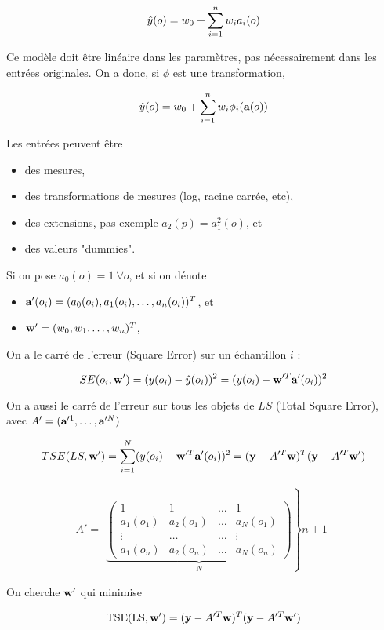 	$$\hat{y}(o) = w_0 + \sum_{i = 1}^n w_i a_i(o)$$
	
	Ce modèle doit être linéaire dans les paramètres, pas nécessairement dans les entrées originales. On a donc, si $\phi$ est une transformation,
	
	$$\hat{y}(o) = w_0 + \sum_{i = 1}^n w_i \phi_i(\textbf{a}(o))$$
	
	Les entrées peuvent être
	
	\begin{itemize}
		\item des mesures,
		\item des transformations de mesures (log, racine carrée, etc),
		\item des extensions, pas exemple $a_2(p) = a^2_1(o)$, et
		\item des valeurs "dummies".
	\end{itemize}
	
	
	Si on pose $a_0(o) = 1 \: \forall o$, et si on dénote
	
	\begin{itemize}
		\item $\textbf{a}'(o_i) = (a_0(o_i), a_1(o_i), \dots , a_n(o_i))^T$, et
		\item $\textbf{w}' = (w_0, w_1, \dots , w_n)^T$,
	\end{itemize}
	
	On a le carré de l'erreur (Square Error) sur un échantillon $i$ :
	
	$$SE(o_i, \textbf{w}') = (y(o_i) - \hat{y}(o_i))^2 = (y(o_i) - \textbf{w}'^T\textbf{a}'(o_i))^2$$
	
	On a aussi le carré de l'erreur sur tous les objets de $LS$ (Total Square Error), avec $A' = (\textbf{a}'^1, \dots , \textbf{a}'^N)$
	
	$$TSE(LS, \textbf{w}') = \sum_{i = 1}^N (y(o_i) - \textbf{w}'^T\textbf{a}'(o_i))^2 = (\textbf{y} - A'^T\textbf{w})^T(\textbf{y} - A'^T\textbf{w}')$$
	
	$$A' = \begin{array}{c}\left. \underbrace{\begin{pmatrix}
	1 & 1 & \dots & 1 \\ 
	a_1(o_1) & a_2(o_1) & \dots & a_N(o_1) \\ 
	\vdots & \dots & \dots & \vdots \\ 
	a_1(o_n) & a_2(o_n) & \dots & a_N(o_n)
	\end{pmatrix}}_{N}\right\} n + 1\end{array} $$
	
		
	On cherche $\textbf{w}'$ qui minimise
		
	$$\text{TSE}(\text{LS}, \textbf{w}') = (\textbf{y} - A'^T\textbf{w})^T(\textbf{y} - A'^T\textbf{w}')$$
		
